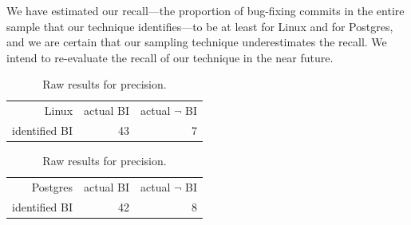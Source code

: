 We have estimated our recall---the proportion of bug-fixing commits in
the entire sample that our technique identifies---to be at least \linuxR for
Linux and \postR for Postgres, and we are certain that our sampling
technique underestimates the recall. We intend to re-evaluate the
recall of our technique in the near future.


\begin{table}
\begin{center}
\begin{tabular}{rrr}
Linux & actual BI & actual $\neg$ BI \\
identified BI & 43 & 7 \\
\end{tabular} 

\begin{tabular}{rrr} Postgres & actual BI & actual $\neg$ BI \\
identified BI & 42 & 8 \\
\end{tabular}
\end{center}
\caption{\label{tab:pr-raw}Raw results for precision.}


\end{table}


